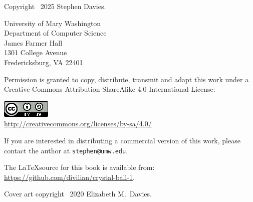 
\thispagestyle{empty}

Copyright \textcopyright \ 2025 Stephen Davies.

\bigskip

University of Mary Washington\\
Department of Computer Science\\
James Farmer Hall\\
1301 College Avenue\\
Fredericksburg, VA  22401

\vspace{.4in}

Permission is granted to copy, distribute, transmit and adapt this work under a
Creative Commons Attribution-ShareAlike 4.0 International License:

\vspace{-.2in}
\begin{center}
\includegraphics{cc_license.png}\\
\smallskip
\url{http://creativecommons.org/licenses/by-sa/4.0/}
\end{center}

\vspace{.1in}
If you are interested in distributing a commercial version of this work, please
contact the author at \texttt{stephen@umw.edu}.

\vspace{1.6in}
The \LaTeX source for this book is available from:
\url{https://github.com/divilian/crystal-ball-1}.

\vspace{.4in}
Cover art copyright \textcopyright \ 2020 Elizabeth M.~Davies.
